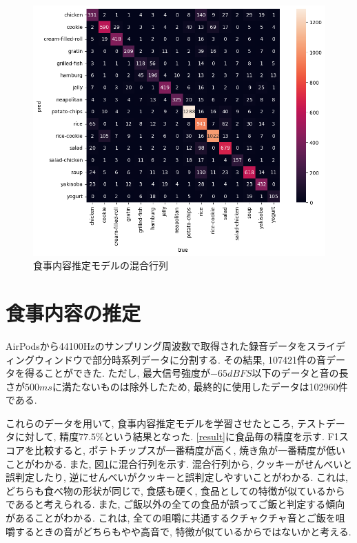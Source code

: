 \begin{figure}[t]
    \begin{center}
        \includegraphics[clip,  width=0.95\hsize]{img/confusion_matrix.png}
        \caption{食事内容推定モデルの混合行列}
        \label{fig:confusion-matrix}
    \end{center}
\end{figure}

\section{食事内容の推定}

AirPodsから44100Hzのサンプリング周波数で取得された録音データをスライディングウィンドウで部分時系列データに分割する. その結果, 107421件の音データを得ることができた. ただし, 最大信号強度が$-65dBFS$以下のデータと音の長さが$500ms$に満たないものは除外したため, 最終的に使用したデータは102960件である.

これらのデータを用いて, 食事内容推定モデルを学習させたところ, テストデータに対して, 精度$77.5\%$という結果となった. \tablename\ref{result}に食品毎の精度を示す. F1スコアを比較すると, ポテトチップスが一番精度が高く, 焼き魚が一番精度が低いことがわかる. また, 図\ref{fig:confusion-matrix}に混合行列を示す. 混合行列から, クッキーがせんべいと誤判定したり, 逆にせんべいがクッキーと誤判定しやすいことがわかる. これは, どちらも食べ物の形状が同じで, 食感も硬く, 食品としての特徴が似ているからであると考えられる. また, ご飯以外の全ての食品が誤ってご飯と判定する傾向があることがわかる. これは, 全ての咀嚼に共通するクチャクチャ音とご飯を咀嚼するときの音がどちらもやや高音で, 特徴が似ているからではないかと考える.

